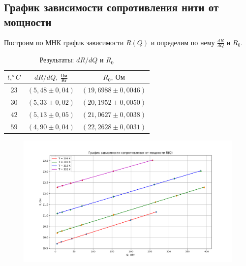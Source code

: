 \documentclass[a4paper,12pt]{article}
\begin{document}
    \subsection{График зависимости сопротивления нити от мощности}
    Построим по МНК график зависимости $R(Q)$ и определим по нему $\frac{dR}{dQ}$ и $R_0$.


            \begin{table}[!ht]
                \centering
                \begin{tabular}{|c|c|c|}
                    \hline

                    $t, ^oC$ & $dR/dQ, \ \frac{\text{Ом}}{\text{Вт}}$ & $R_0, \ \text{Ом}$\\ \hline
                    $23$ & $(5,48 \pm 0,04)$ & $(19,6988 \pm 0,0046)$\\ \hline
                    $30$ & $(5,33 \pm 0,02)$ & $(20,1952 \pm 0,0050)$\\ \hline
                    $42$ & $(5,13 \pm 0,05)$ & $(21,0627 \pm 0,0038)$\\ \hline
                    $59$ & $(4,90 \pm 0,04)$ & $(22,2628 \pm 0,0031)$\\ \hline

                \end{tabular}
                \caption{Результаты: $dR/dQ$ и $R_0$ }
                \label{RQ_coeffs}
            \end{table}

    \begin{figure}[!ht]
        \begin{center}
            \includegraphics[width=1.1 \textwidth]{R(Q).png}
        \end{center}
    \end{figure}
\end{document}
